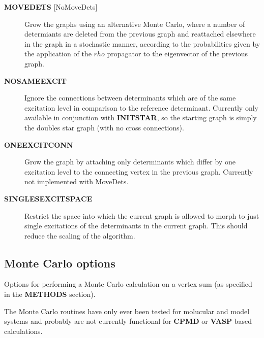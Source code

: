 \documentclass[openany,a4paper,10pt]{manual}
\begin{document}
\begin{description}
\item[\textbf{MOVEDETS} {[}NoMoveDets{]}]
Grow the graphs using an alternative Monte Carlo, where a number
of determiants are deleted from the previous graph and reattached
elsewhere in the graph in a stochastic manner, according to the
probabilities given by the application of the $rho$ propagator
to the eigenvector of the previous graph.

\item[\textbf{NOSAMEEXCIT}]
Ignore the connections between determinants which are of the
same excitation level in comparison to the reference determinant.
Currently only available in conjunction with \textbf{INITSTAR}, so the
starting graph is simply the doubles star graph (with no cross
connections).

\item[\textbf{ONEEXCITCONN}]
Grow the graph by attaching only determinants which differ by one
excitation level to the connecting vertex in the previous graph.
Currently not implemented with MoveDets.

\item[\textbf{SINGLESEXCITSPACE}]
Restrict the space into which the current graph is allowed to morph
to just single excitations of the determinants in the current graph.
This should reduce the scaling of the algorithm.

\end{description}


\subsection{Monte Carlo options}

Options for performing a Monte Carlo calculation on a vertex sum (as
specified in the \textbf{METHODS} section).

The Monte Carlo routines have only ever been tested for molucular and
model systems and probably are not currently functional for \textbf{CPMD}
or \textbf{VASP} based calculations.
\end{document}
